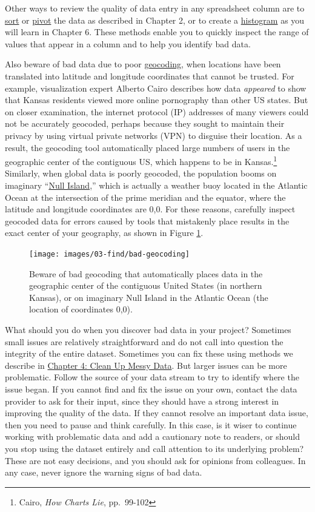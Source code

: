\documentclass[
  english,
]{book}
\begin{document}
Other ways to review the quality of data entry in any spreadsheet column are to \href{sort.html}{sort} or \href{pivot.html}{pivot} the data as described in Chapter 2, or to create a \href{histogram-google.html}{histogram} as you will learn in Chapter 6. These methods enable you to quickly inspect the range of values that appear in a column and to help you identify bad data.

Also beware of bad data due to poor \href{geocode.html}{geocoding}, when locations have been translated into latitude and longitude coordinates that cannot be trusted. For example, visualization expert Alberto Cairo describes how data \emph{appeared} to show that Kansas residents viewed more online pornography than other US states. But on closer examination, the internet protocol (IP) addresses of many viewers could not be accurately geocoded, perhaps because they sought to maintain their privacy by using virtual private networks (VPN) to disguise their location. As a result, the geocoding tool automatically placed large numbers of users in the geographic center of the contiguous US, which happens to be in Kansas.\footnote{Cairo, \emph{How {Charts Lie}}, pp.~99-102} Similarly, when global data is poorly geocoded, the population booms on imaginary ``\href{https://en.wikipedia.org/wiki/Null_Island}{Null Island},'' which is actually a weather buoy located in the Atlantic Ocean at the intersection of the prime meridian and the equator, where the latitude and longitude coordinates are 0,0. For these reasons, carefully inspect geocoded data for errors caused by tools that mistakenly place results in the exact center of your geography, as shown in Figure \ref{fig:bad-geocoding}.



\begin{figure}
\texttt{[image: images/03-find/bad-geocoding]} \caption{Beware of bad geocoding that automatically places data in the geographic center of the contiguous United States (in northern Kansas), or on imaginary Null Island in the Atlantic Ocean (the location of coordinates 0,0).}\label{fig:bad-geocoding}
\end{figure}

What should you do when you discover bad data in your project? Sometimes small issues are relatively straightforward and do not call into question the integrity of the entire dataset. Sometimes you can fix these using methods we describe in \href{clean.html}{Chapter 4: Clean Up Messy Data}. But larger issues can be more problematic. Follow the source of your data stream to try to identify where the issue began. If you cannot find and fix the issue on your own, contact the data provider to ask for their input, since they should have a strong interest in improving the quality of the data. If they cannot resolve an important data issue, then you need to pause and think carefully. In this case, is it wiser to continue working with problematic data and add a cautionary note to readers, or should you stop using the dataset entirely and call attention to its underlying problem? These are not easy decisions, and you should ask for opinions from colleagues. In any case, never ignore the warning signs of bad data.
\end{document}
